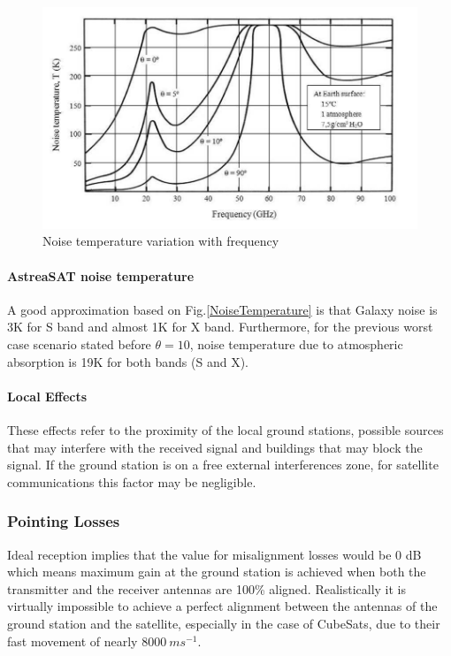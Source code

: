 \begin{figure}[H]
	\includegraphics[scale=0.55]{./sections/SatelliteDept/sections/images/NoiseTemperature2}
	\centering
	\caption[Noise temperature variation with frequency]{Noise temperature variation with frequency \cite{Jorge2012}}
	\label{NoiseTemperature2}
\end{figure}

\paragraph{AstreaSAT noise temperature} A good approximation based on Fig.\ref{NoiseTemperature} is that Galaxy noise is 3K for S band and almost 1K for X band. Furthermore, for the previous worst case scenario stated before $\theta=10$, noise temperature due to atmospheric absorption is 19K for both bands (S and X).

\paragraph{Local Effects} These effects refer to the proximity of the local ground stations, possible sources that may interfere with the received signal and buildings that may block the signal. If the ground station is on a free external interferences zone, for satellite communications this factor may be negligible.

\subsubsection{Pointing Losses}

Ideal reception implies that the value for misalignment losses would be 0 dB which means maximum gain at the ground station is achieved when both the transmitter and the receiver antennas are 100\% aligned. Realistically it is virtually impossible to achieve a perfect alignment between the antennas of the ground station and the satellite, especially in the case of CubeSats, due to their fast movement of nearly $8000\ ms^{-1}$.

